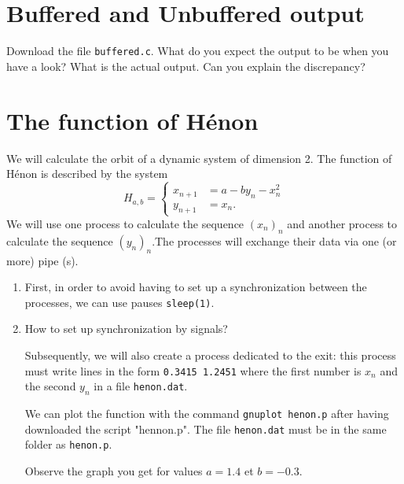\documentclass[11pt]{article}
\begin{document}
\section{Buffered and Unbuffered output}
Download the file \verb*|buffered.c|. What do you expect the output to be when you have a look? What is the actual output. Can you explain the discrepancy?

\section{The function of Hénon}

We will calculate the orbit of a dynamic system of dimension 2. The function of Hénon is described by the system 
\begin{equation*}
	\label{eq:1}
	H_{a,b} = \left\{
	\begin{aligned}
		x_{n+1} &= a - by_{n} - x_{n}^{2} \\
		y_{n+1} &= x_{n}.
	\end{aligned}
	\right.
\end{equation*}
We will use one process to calculate the sequence \( (x_{n})_{n} \)  and another process to calculate the sequence  \( (y_{n})_{n} \).The processes will exchange their data via one (or more) pipe (s). 

\begin{enumerate}
	\item First, in order to avoid having to set up a synchronization between the processes, we can use pauses \verb|sleep(1)|.
	\item How to set up synchronization by signals?
	\medskip
	
Subsequently, we will also create a process dedicated to the exit: this process must write lines in the form \texttt{0.3415 1.2451} where the first number
is $x_{n}$ and the second $y_{n}$ in a file \texttt{henon.dat}.

We can plot the function with the command \texttt{gnuplot henon.p} after having downloaded the script "hennon.p". The file \texttt{henon.dat} must be in the same folder as \texttt{henon.p}. 

Observe the graph you get for values \( a = 1.4 \) et \( b = -0.3 \).
\end{enumerate}
\end{document}

